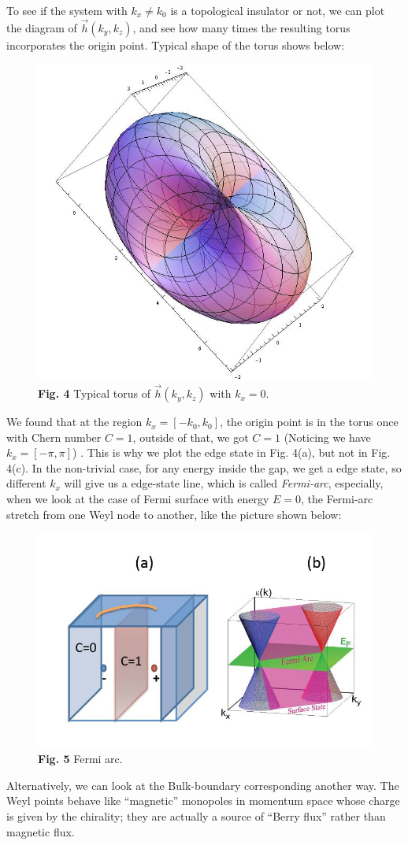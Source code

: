 \documentclass[letterpaper,10pt,english]{sphinxmanual}
\begin{document}
To see if the system with \(k_x\neq k_0\) is a topological insulator or not, we can plot the diagram of \(\vec{h}(k_y,k_z)\), and see how many times the resulting torus incorporates the origin point. Typical shape of the torus shows below:
\begin{figure}[htbp]
\centering
\capstart

\includegraphics[width=0.450\linewidth]{4.jpg}
\caption{\textbf{Fig. 4} Typical torus of \(\vec{h}(k_y,k_z)\) with \(k_x=0\).}\end{figure}

We found that at the region \(k_x=[-k_0,k_0]\), the origin point is in the torus once with Chern number \(C=1\), outside of that, we got \(C=1\) (Noticing we have \(k_x=[-\pi,\pi]\)) . This is why we plot the edge state in Fig. 4(a), but not in Fig. 4(c). In the non-trivial case, for any energy inside the gap, we get a edge state, so different \(k_x\) will give us a edge-state line, which is called \emph{Fermi-arc}, especially, when we look at the case of Fermi surface with energy \(E=0\), the Fermi-arc stretch from one Weyl node to another, like the picture shown below:
\begin{figure}[htbp]
\centering
\capstart

\includegraphics[width=0.600\linewidth]{5.png}
\caption{\textbf{Fig. 5} Fermi arc.}\end{figure}

Alternatively, we can look at the Bulk-boundary corresponding another way. The Weyl points behave like “magnetic” monopoles in momentum space whose charge is given by the chirality; they are actually a source of “Berry flux” rather than magnetic flux.
\end{document}
